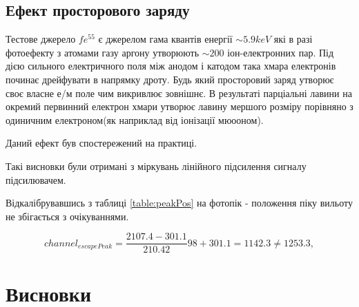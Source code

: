 \documentclass[pdftex,14pt]{scrartcl}
\begin{document}
\begin{spacing}{1.5}
	\subsection{Ефект просторового заряду}
	
	
	
	
	Тестове джерело $fe^{55}$ є джерелом гама квантів енергії $\sim 5.9 keV$ які в разі фотоефекту  з атомами газу аргону утворюють $\sim 200$	 іон-електронних пар. Під дією сильного електричного поля між анодом і катодом така хмара електронів починає дрейфувати в напрямку дроту. Будь який просторовий заряд утворює своє власне е/м поле чим викривлює зовнішнє. В результаті парціальні лавини на окремий первинний електрон хмари утворює лавину мершого розміру порівняно з одиничним електроном(як наприклад від іонізації мюооном).
	
	Даний ефект був спостережений на практиці.

	Такі висновки були отримані  з міркувань лінійного підсилення сигналу підсилювачем.
	

	Відкалібрувавшись з таблиці \ref{table:peakPos} на фотопік - положення піку вильоту не збігається з очікуваннями.
	
	\begin{equation}
			channel_{escapePeak} = \frac{2107.4 - 301.1}{210.42} 98 + 301.1 = 1142.3 \ne 1253.3,
	\end{equation}
	
	
	\section{ Висновки}
	

\end{spacing}
\end{document}
